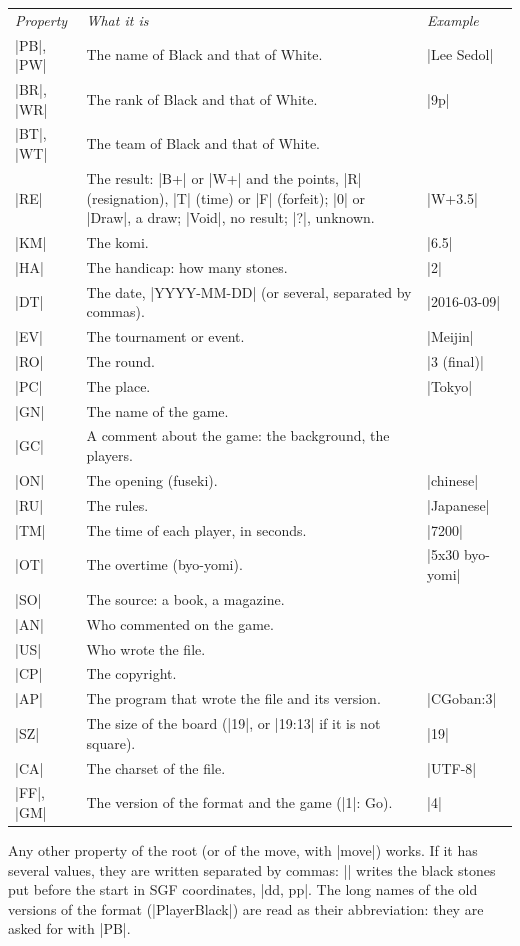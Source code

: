 \begin{command}{\sgfinfo{}}
	\begin{center}
		\small
		\begin{tabular}{lp{6.5cm}l}
			\emph{Property} & \emph{What it is} & \emph{Example} \\[2pt]
			|PB|, |PW| & The name of Black and that of White. & |Lee Sedol| \\
			|BR|, |WR| & The rank of Black and that of White. & |9p| \\
			|BT|, |WT| & The team of Black and that of White. & \\
			|RE| & The result: |B+| or |W+| and the points, |R| (resignation), |T| (time) or |F| (forfeit); |0| or |Draw|, a draw; |Void|, no result; |?|, unknown. & |W+3.5| \\
			|KM| & The komi. & |6.5| \\
			|HA| & The handicap: how many stones. & |2| \\
			|DT| & The date, |YYYY-MM-DD| (or several, separated by commas). & |2016-03-09| \\
			|EV| & The tournament or event. & |Meijin| \\
			|RO| & The round. & |3 (final)| \\
			|PC| & The place. & |Tokyo| \\
			|GN| & The name of the game. & \\
			|GC| & A comment about the game: the background, the players. & \\
			|ON| & The opening (fuseki). & |chinese| \\
			|RU| & The rules. & |Japanese| \\
			|TM| & The time of each player, in seconds. & |7200| \\
			|OT| & The overtime (byo-yomi). & |5x30 byo-yomi| \\
			|SO| & The source: a book, a magazine. & \\
			|AN| & Who commented on the game. & \\
			|US| & Who wrote the file. & \\
			|CP| & The copyright. & \\
			|AP| & The program that wrote the file and its version. & |CGoban:3| \\
			|SZ| & The size of the board (|19|, or |19:13| if it is not square). & |19| \\
			|CA| & The charset of the file. & |UTF-8| \\
			|FF|, |GM| & The version of the format and the game (|1|: Go). & |4| \\
		\end{tabular}
	\end{center}

	Any other property of the root (or of the move, with |move|) works. If it has several values, they are written separated by commas: || writes the black stones put before the start in SGF coordinates, |dd, pp|. The long names of the old versions of the format (|PlayerBlack|) are read as their abbreviation: they are asked for with |PB|.
\end{command}

